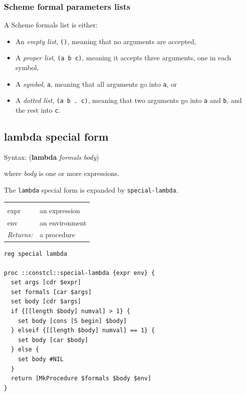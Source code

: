 \documentclass[twoside]{report}
\begin{document}
\begin{pulledtext}

\subsubsection{Scheme formal parameters lists}
\label{scheme-formal-parameters-lists}

A Scheme formals list is either:

\begin{itemize}
\item An \emph{empty list}, \texttt{()}, meaning that no arguments are accepted,
\item A \emph{proper list}, \texttt{(a b c)}, meaning it accepts three arguments, one in each symbol,
\item A \emph{symbol}, \texttt{a}, meaning that all arguments go into \texttt{a}, or
\item A \emph{dotted list}, \texttt{(a b . c)}, meaning that two arguments go into \texttt{a} and \texttt{b}, and the rest into \texttt{c}.
\end{itemize}
\end{pulledtext}

\subsection{lambda special form}
\label{lambda-special-form}

Syntax: (\textbf{lambda} \emph{formals} \emph{body})

where \emph{body} is one or more expressions.

The \texttt{lambda} special form is expanded by \texttt{special-lambda}.

\noindent\begin{tabular}{ |p{1.9cm} p{8cm}| }
\hline
\rowcolor[HTML]{CCCCCC} \multicolumn{2}{|l|}{\bf special-lambda (internal)} \\
expr & an expression \\
env & an environment \\
\textit{Returns:} & a procedure \\
\hline
\end{tabular}

\begin{lstlisting}
reg special lambda

proc ::constcl::special-lambda {expr env} {
  set args [cdr $expr]
  set formals [car $args]
  set body [cdr $args]
  if {[[length $body] numval] > 1} {
    set body [cons [S begin] $body]
  } elseif {[[length $body] numval] == 1} {
    set body [car $body]
  } else {
    set body #NIL
  }
  return [MkProcedure $formals $body $env]
}
\end{lstlisting}
\end{document}
